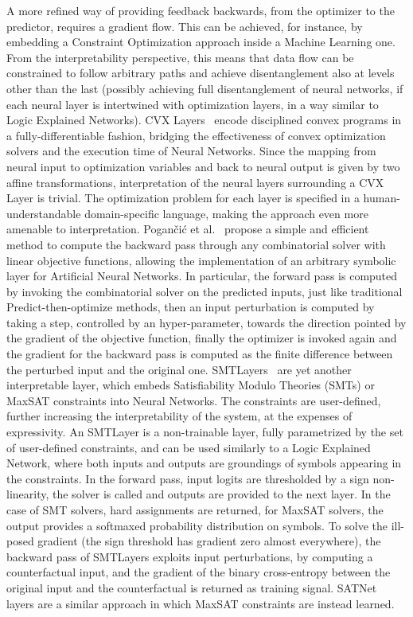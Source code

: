 A more refined way of providing feedback backwards, from the optimizer to the predictor, requires a gradient flow. This can be achieved, for instance, by embedding a Constraint Optimization approach inside a Machine Learning one. 
From the interpretability perspective, this means that data flow can be constrained to follow arbitrary paths and achieve disentanglement also at levels other than the last (possibly achieving full disentanglement of neural networks, if each neural layer is intertwined with optimization layers, in a way similar to Logic Explained Networks).
%
CVX Layers~\cite{agrawal2019differentiable} encode disciplined convex programs in a fully-differentiable fashion, bridging the effectiveness of convex optimization solvers and the execution time of Neural Networks. Since the mapping from neural input to optimization variables and back to neural output is given by two affine transformations, interpretation of the neural layers surrounding a CVX Layer is trivial.
The optimization problem for each layer is specified in a human-understandable domain-specific language, making the approach even more amenable to interpretation.
%
Pogan\v{c}i\'c et al.~\cite{poganvcic2020differentiation} propose a simple and efficient method to compute the backward pass through any combinatorial solver with linear objective functions, allowing the implementation of an arbitrary symbolic layer for Artificial Neural Networks.
In particular, the forward pass is computed by invoking the combinatorial solver on the predicted inputs, just like traditional Predict-then-optimize methods, then an input perturbation is computed by taking a step, controlled by an hyper-parameter, towards the direction pointed by the gradient of the objective function, finally the optimizer is invoked again and the gradient for the backward pass is computed as the finite difference between the perturbed input and the original one.
%
SMTLayers~\cite{fredrikson2023learning} are yet another interpretable layer, which embeds Satisfiability Modulo Theories (SMTs) or MaxSAT constraints into Neural Networks. The constraints are user-defined, further increasing the interpretability of the system, at the expenses of expressivity.
An SMTLayer is a non-trainable layer, fully parametrized by the set of user-defined constraints, and can be used similarly to a Logic Explained Network, where both inputs and outputs are groundings of symbols appearing in the constraints.
In the forward pass, input logits are thresholded by a sign non-linearity, the solver is called and outputs are provided to the next layer. In the case of SMT solvers, hard assignments are returned, for MaxSAT solvers, the output provides a softmaxed probability distribution on symbols.
To solve the ill-posed gradient (the sign threshold has gradient zero almost everywhere), the backward pass of SMTLayers exploits input perturbations, by computing a counterfactual input, and the gradient of the binary cross-entropy between the original input and the counterfactual is returned as training signal.
SATNet~\cite{wang2019satnet} layers are a similar approach in which MaxSAT constraints are instead learned.

